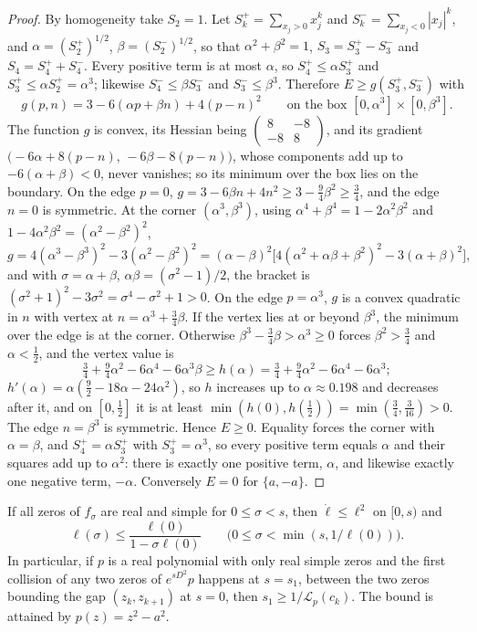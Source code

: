 \begin{proof}
By homogeneity take $S_2=1$. Let $S_k^+=\sum_{x_j>0}x_j^k$ and $S_k^-=\sum_{x_j<0}|x_j|^k$, and $\alpha=(S_2^+)^{1/2}$, $\beta=(S_2^-)^{1/2}$, so that $\alpha^2+\beta^2=1$, $S_3=S_3^+-S_3^-$ and $S_4=S_4^++S_4^-$. Every positive term is at most $\alpha$, so $S_4^+\le\alpha S_3^+$ and $S_3^+\le\alpha S_2^+=\alpha^3$; likewise $S_4^-\le\beta S_3^-$ and $S_3^-\le\beta^3$. Therefore $E\ge g(S_3^+,S_3^-)$ with
\[
g(p,n)=3-6(\alpha p+\beta n)+4(p-n)^2\qquad\text{on the box }[0,\alpha^3]\times[0,\beta^3].
\]
The function $g$ is convex, its Hessian being $\begin{pmatrix}8&-8\\-8&8\end{pmatrix}$, and its gradient $\big(-6\alpha+8(p-n),\,-6\beta-8(p-n)\big)$, whose components add up to $-6(\alpha+\beta)<0$, never vanishes; so its minimum over the box lies on the boundary. On the edge $p=0$, $g=3-6\beta n+4n^2\ge3-\frac94\beta^2\ge\frac34$, and the edge $n=0$ is symmetric. At the corner $(\alpha^3,\beta^3)$, using $\alpha^4+\beta^4=1-2\alpha^2\beta^2$ and $1-4\alpha^2\beta^2=(\alpha^2-\beta^2)^2$,
\[
g=4(\alpha^3-\beta^3)^2-3(\alpha^2-\beta^2)^2=(\alpha-\beta)^2\big[4(\alpha^2+\alpha\beta+\beta^2)^2-3(\alpha+\beta)^2\big],
\]
and with $\sigma=\alpha+\beta$, $\alpha\beta=(\sigma^2-1)/2$, the bracket is $(\sigma^2+1)^2-3\sigma^2=\sigma^4-\sigma^2+1>0$. On the edge $p=\alpha^3$, $g$ is a convex quadratic in $n$ with vertex at $n=\alpha^3+\frac34\beta$. If the vertex lies at or beyond $\beta^3$, the minimum over the edge is at the corner. Otherwise $\beta^3-\frac34\beta>\alpha^3\ge0$ forces $\beta^2>\frac34$ and $\alpha<\frac12$, and the vertex value is
\[
\tfrac34+\tfrac94\alpha^2-6\alpha^4-6\alpha^3\beta\ge h(\alpha)=\tfrac34+\tfrac94\alpha^2-6\alpha^4-6\alpha^3;
\]
$h'(\alpha)=\alpha(\frac92-18\alpha-24\alpha^2)$, so $h$ increases up to $\alpha\approx0.198$ and decreases after it, and on $[0,\frac12]$ it is at least $\min(h(0),h(\frac12))=\min(\frac34,\frac3{16})>0$. The edge $n=\beta^3$ is symmetric. Hence $E\ge0$. Equality forces the corner with $\alpha=\beta$, and $S_4^+=\alpha S_3^+$ with $S_3^+=\alpha^3$, so every positive term equals $\alpha$ and their squares add up to $\alpha^2$: there is exactly one positive term, $\alpha$, and likewise exactly one negative term, $-\alpha$. Conversely $E=0$ for $\{a,-a\}$.
\end{proof}

\begin{theorem}\label{thm:wigbiane:riccati}
If all zeros of $f_\sigma$ are real and simple for $0\le\sigma<s$, then $\dot\ell\le\ell^2$ on $[0,s)$ and
\[
\ell(\sigma)\le\frac{\ell(0)}{1-\sigma\ell(0)}\qquad\big(0\le\sigma<\min(s,1/\ell(0))\big).
\]
In particular, if $p$ is a real polynomial with only real simple zeros and the first collision of any two zeros of $e^{sD^2}p$ happens at $s=s_1$, between the two zeros bounding the gap $(z_k,z_{k+1})$ at $s=0$, then $s_1\ge1/\mathcal L_p(c_k)$. The bound is attained by $p(z)=z^2-a^2$.
\end{theorem}

